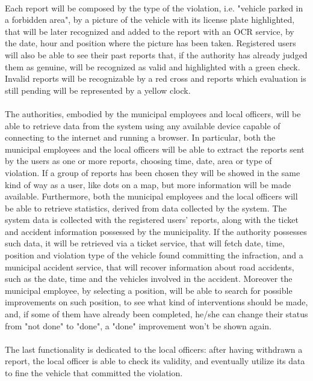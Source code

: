 			\paragraph{}
				Each report will be composed by the type of the violation, i.e. "vehicle parked in a forbidden area", by a picture of the vehicle with its license plate highlighted, that will be later recognized and added to the report with an OCR service, by the date, hour and position where the picture has been taken. Registered users will also be able to see their past reports that, if the authority has already judged them as genuine, will be recognized as valid and highlighted with a green check. Invalid reports will be recognizable by a red cross and reports which evaluation is still pending will be represented by a yellow clock.
			\paragraph{}
				The authorities, embodied by the municipal employees and local officers, will be able to retrieve data from the system using any available device capable of connecting to the internet and running a browser. In particular, both the municipal employees and the local officers will be able to extract the reports sent by the users as one or more reports, choosing time, date, area or type of violation. If a group of reports has been chosen they will be showed in the same kind of way as a user, like dots on a map, but more information will be made available. Furthermore, both the municipal employees and the local officers will be able to retrieve statistics, derived from data collected by the system. The system data is collected with the registered users' reports, along with the ticket and accident information possessed by the municipality. If the authority possesses such data, it will be retrieved via a ticket service, that will fetch date, time, position and violation type of the vehicle found committing the infraction, and a municipal accident service, that will recover information about road accidents, such as the date, time and the vehicles involved in the accident. Moreover the municipal employee, by selecting a position, will be able to search for possible improvements on such position, to see what kind of interventions should be made, and, if some of them have already been completed, he/she can change their status from "not done" to "done", a "done" improvement won't be shown again.
			\paragraph{}
				The last functionality is dedicated to the local officers: after having withdrawn a report, the local officer is able to check its validity, and eventually utilize its data to fine the vehicle that committed the violation.

